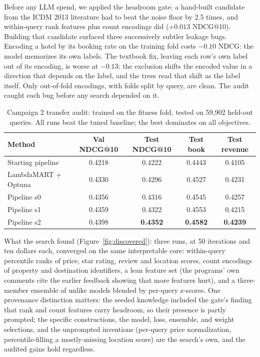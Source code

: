\documentclass[]{ceurart}
\begin{document}
Before any LLM spend, we applied the headroom gate: a hand-built candidate
from the ICDM 2013 literature had to beat the noise floor by 2.5 times, and
within-query rank features plus count encodings did ($+0.013$ NDCG@10).
Building that candidate surfaced three successively subtler leakage bugs.
Encoding a hotel by its booking rate on the training fold costs $-0.10$
NDCG: the model memorizes its own labels. The textbook fix, leaving each
row's own label out of its encoding, is worse at $-0.13$: the exclusion
shifts the encoded value in a direction that depends on the label, and the
trees read that shift as the label itself. Only out-of-fold encodings, with
folds split by query, are clean. The audit caught each bug before any
search depended on it.

\begin{table}
  \caption{Campaign 2 transfer audit: trained on the fitness fold, tested on
  59{,}902 held-out queries. All runs beat the tuned baseline; the best
  dominates on all objectives.}
  \label{tab:transfer}
  \begin{tabular}{lcccc}
    \toprule
    Method & Val NDCG@10 & Test NDCG@10 & Test book & Test revenue \\
    \midrule
    Starting pipeline & 0.4218 & 0.4222 & 0.4443 & 0.4105 \\
    LambdaMART + Optuna & 0.4330 & 0.4296 & 0.4527 & 0.4231 \\
    Pipeline s0 & 0.4356 & 0.4316 & 0.4545 & 0.4257 \\
    Pipeline s1 & 0.4359 & 0.4322 & 0.4553 & 0.4215 \\
    Pipeline s2 & 0.4398 & \textbf{0.4352} & \textbf{0.4582} & \textbf{0.4239} \\
    \bottomrule
  \end{tabular}
\end{table}

What the search found (Figure~\ref{fig:discovered}): three runs, at 50
iterations and ten dollars each, converged on the same interpretable core: within-query percentile
ranks of price, star rating, review and location scores, count encodings of
property and destination identifiers, a lean feature set (the programs' own comments cite the earlier feedback
showing that more features hurt), and a three-member ensemble of unlike
models blended by per-query z-scores. One provenance distinction matters: the seeded knowledge included the
gate's finding that rank and count features carry headroom, so their
presence is partly prompted; the specific constructions, the model, loss,
ensemble, and weight selections, and the unprompted inventions (per-query
price normalization, percentile-filling a mostly-missing location score)
are the search's own, and the audited gains hold regardless.
\end{document}
